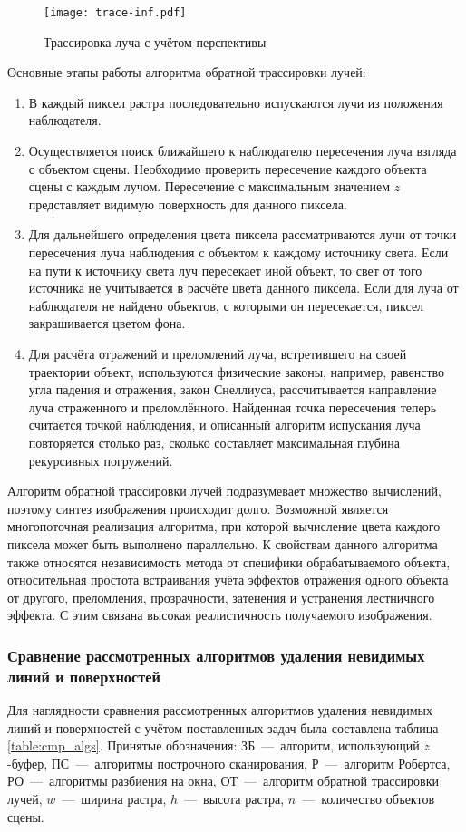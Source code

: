 \begin{figure}[h!]
    \centering
    \texttt{[image: trace-inf.pdf]}
    \caption{Трассировка луча с учётом перспективы}
    \label{img:trace-near}
\end{figure} 

Основные этапы работы алгоритма обратной трассировки лучей:
\begin{enumerate}[label={\arabic*)}]
	\item В каждый пиксел растра последовательно испускаются лучи из положения наблюдателя.
	\item Осуществляется поиск ближайшего к наблюдателю пересечения луча взгляда с объектом сцены. Необходимо проверить пересечение каждого объекта сцены с каждым лучом. Пересечение с максимальным значением $z$ представляет видимую поверхность для данного пиксела.
	\item Для дальнейшего определения цвета пиксела рассматриваются лучи от точки пересечения луча наблюдения с объектом к каждому источнику света. Если на пути к источнику света луч пересекает иной объект, то свет от того источника не учитывается в расчёте цвета данного пиксела. Если для луча от наблюдателя не найдено объектов, с которыми он пересекается, пиксел закрашивается цветом фона.
	\item Для расчёта отражений и преломлений луча, встретившего на своей траектории объект, используются физические законы, например, равенство угла падения и отражения, закон Снеллиуса, рассчитывается направление луча отраженного и преломлённого. Найденная точка пересечения теперь считается точкой наблюдения, и описанный алгоритм испускания луча повторяется столько раз, сколько составляет максимальная глубина рекурсивных погружений.
\end{enumerate}

Алгоритм обратной трассировки лучей подразумевает множество вычислений, поэтому синтез изображения происходит долго. Возможной является многопоточная реализация алгоритма, при которой вычисление цвета каждого пиксела может быть выполнено параллельно. К свойствам данного алгоритма также относятся независимость метода от специфики обрабатываемого объекта, относительная простота встраивания учёта эффектов отражения одного объекта от другого, преломления, прозрачности, затенения и устранения лестничного эффекта. С этим связана высокая реалистичность получаемого изображения.

\subsubsection{Сравнение рассмотренных алгоритмов удаления невидимых линий и поверхностей}
Для наглядности сравнения рассмотренных алгоритмов удаления невидимых линий и поверхностей с учётом поставленных задач была составлена таблица \ref{table:cmp_algs}. Принятые обозначения: ЗБ~---~алгоритм, использующий $z$-буфер, ПС~---~алгоритмы построчного сканирования, Р~---~алгоритм Робертса, РО~---~алгоритмы разбиения на окна, ОТ~---~алгоритм обратной трассировки лучей, $w$~---~ширина растра, $h$~---~высота растра, $n$~---~количество объектов сцены.

